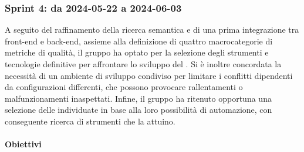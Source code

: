 \subsubsection{Sprint 4: da 2024-05-22 a 2024-06-03}
A seguito del raffinamento della ricerca semantica e di una prima integrazione tra
front-end e back-end, assieme alla definizione di quattro macrocategorie di metriche
di qualità, il gruppo ha optato per la selezione degli strumenti e tecnologie definitive per affrontare lo sviluppo del .
Si è inoltre concordata la necessità di un ambiente di sviluppo condiviso per limitare i conflitti dipendenti da configurazioni differenti, che possono provocare rallentamenti o malfunzionamenti inaspettati. Infine, il gruppo ha ritenuto opportuna una selezione delle  individuate in base alla loro possibilità di automazione, con conseguente ricerca di strumenti che la attuino.

\paragraph{Obiettivi}

\vspace{0.5\baselineskip}
\par [Inserire Gantt]